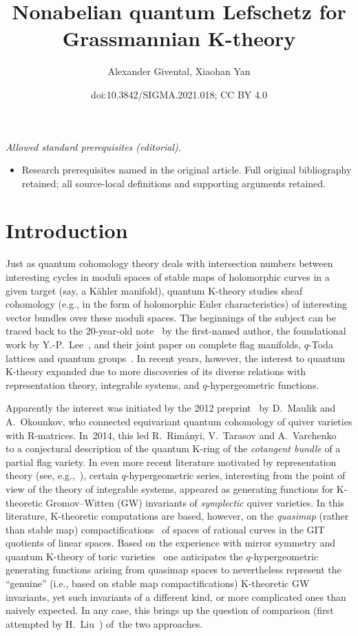 \documentclass[10pt,a4paper]{amsart}
\title{Nonabelian quantum Lefschetz for Grassmannian K-theory}
\author{Alexander Givental, Xiaohan Yan}
\date{doi:10.3842/SIGMA.2021.018; CC BY 4.0}
\numberwithin{equation}{section}
\theoremstyle{definition}
\theoremstyle{plain}
\begin{document}
\maketitle
\noindent\textit{Allowed standard prerequisites (editorial).}\begin{itemize}
\item Research prerequisites named in the original article. Full original bibliography retained; all source-local definitions and supporting arguments retained.
\end{itemize}\medskip
\section{Introduction}

Just as quantum cohomology theory deals with intersection numbers between interesting cyc\-les in moduli spaces of stable maps of holomorphic curves in a given target (say, a K\"ahler manifold),
quantum K-theory studies sheaf cohomology (e.g., in the form of holomorphic Euler characteristics) of interesting vector bundles over these moduli spaces. The beginnings of the subject can be traced back to the 20-year-old note~\cite{Givental:WDVV} by the first-named author, the foundational work by Y.-P.~Lee~\cite{Lee}, and their joint paper on complete flag manifolds, $q$-Toda lattices and quantum groups~\cite{Givental-Lee}. In recent years, however, the interest to quantum K-theory expanded due to more discoveries of its diverse relations with representation theory, integrable systems, and $q$-hypergeometric functions.

Apparently the interest was initiated by the 2012 preprint~\cite{MO} by D.~Maulik and A.~Okoun\-kov, who connected equivariant quantum cohomology of quiver varieties with R-matrices. In~2014, this led R.~Rim{\'a}nyi, V.~Tarasov and A.~Varchenko~\cite{RTV} to a conjectural description of the quantum K-ring of the {\em cotangent bundle} of a partial flag variety. In even more recent literature motivated by representation theory (see, e.g.,~\cite{KPSZ, Ok, PSZ}), certain $q$-hypergeometric series, interesting from the point of view of the theory of integrable systems, appeared as generating functions for K-theoretic Gromov--Witten (GW) invariants of {\em symplectic} quiver varieties. In this literature, K-theoretic computations are based, however, on the {\em quasimap} (rather than stable map) compactifications~\cite{CKM} of spaces of rational curves in the GIT quotients of linear spaces. Based on the experience with mirror symmetry and quantum K-theory of toric varieties~\cite{Givental:perm5} one anticipates the $q$-hypergeometric generating functions arising from quasimap spaces to never\-theless represent the ``genuine'' (i.e., based on stable map compactifications) K-theoretic GW invariants, yet such invariants of a different kind, or more complicated ones than naively expec\-ted. In any case, this brings up the question of comparison (first attempted by H.~Liu~\cite{Liu}) of~the two approaches.
\end{document}
